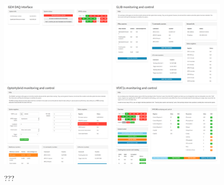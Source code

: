       \begin{figure}[h!]
        \centering
        \includegraphics[width=0.49\textwidth]{img/II-3-test-beam/app-home.png}
        \includegraphics[width=0.49\textwidth]{img/II-3-test-beam/app-glib.png} \\
        \vspace*{0.3cm}
        \includegraphics[width=0.49\textwidth]{img/II-3-test-beam/app-oh.png}
        \includegraphics[width=0.49\textwidth]{img/II-3-test-beam/app-vfat2.png}
        \caption{???}
        \label{fig:II-3-app-monitoring}
      \end{figure}

